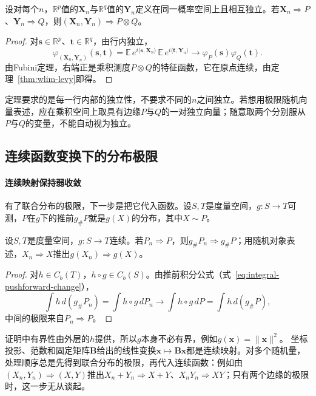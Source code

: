 \begin{theorem}[行内独立的联合极限]
\label{thm:wlim-independent-product}
设对每个$n$，$\mathbb R^p$值的$\bm X_n$与$\mathbb R^q$值的$\bm Y_n$定义在同一概率空间上且相互独立。若$\bm X_n\Rightarrow P$、$\bm Y_n\Rightarrow Q$，则$(\bm X_n,\bm Y_n)\Rightarrow P\otimes Q$。
\end{theorem}

\begin{proof}
对$\bm s\in\mathbb R^p$、$\bm t\in\mathbb R^q$，由行内独立，
\[
  \varphi_{(\bm X_n,\bm Y_n)}(\bm s,\bm t)=\mathbb E\,e^{i\langle\bm s,\bm X_n\rangle}\,\mathbb E\,e^{i\langle\bm t,\bm Y_n\rangle}\to\varphi_P(\bm s)\varphi_Q(\bm t).
\]
由Fubini定理，右端正是乘积测度$P\otimes Q$的特征函数，它在原点连续，由定理~\ref{thm:wlim-levy}即得。
\end{proof}

定理要求的是每一行内部的独立性，不要求不同的$n$之间独立。若想用极限随机向量表述，应在乘积空间上取具有边缘$P$与$Q$的一对独立向量；随意取两个分别服从$P$与$Q$的变量，不能自动视为独立。

\subsection{连续函数变换下的分布极限}

\paragraph{连续映射保持弱收敛}
有了联合分布的极限，下一步是把它代入函数。设$S,T$是度量空间，$g:S\to T$可测，$P$在$g$下的推前$g_\#P$就是$g(X)$的分布，其中$X\sim P$。

\begin{theorem}
\label{thm:wlim-continuous-mapping}
设$S,T$是度量空间，$g:S\to T$连续。若$P_n\Rightarrow P$，则$g_\#P_n\Rightarrow g_\#P$；用随机对象表述，$X_n\Rightarrow X$推出$g(X_n)\Rightarrow g(X)$。
\end{theorem}

\begin{proof}
对$h\in C_b(T)$，$h\circ g\in C_b(S)$。由推前积分公式（式~\eqref{eq:integral-pushforward-change}），
\[
  \int h\,d(g_\#P_n)=\int h\circ g\,dP_n\to\int h\circ g\,dP=\int h\,d(g_\#P),
\]
中间的极限来自$P_n\Rightarrow P$。
\end{proof}

证明中有界性由外层的$h$提供，所以$g$本身不必有界，例如$g(\bm x)=\lVert\bm x\rVert^2$。
坐标投影、范数和固定矩阵$\bm B$给出的线性变换$\bm x\mapsto\bm B\bm x$都是连续映射。对多个随机量，处理顺序总是先得到联合分布的极限，再代入连续函数：例如由$(X_n,Y_n)\Rightarrow(X,Y)$推出$X_n+Y_n\Rightarrow X+Y$、$X_nY_n\Rightarrow XY$；只有两个边缘的极限时，这一步无从谈起。

